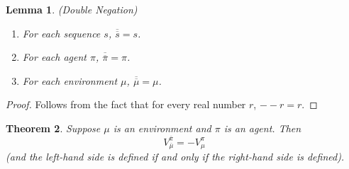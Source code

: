 \documentclass{article}
\newtheorem{theorem}{Theorem}
\newtheorem{lemma}[theorem]{Lemma}
\begin{document}
\begin{lemma}
\label{doublesubtractionlemma}
(Double Negation)
    \begin{enumerate}
        \item For each sequence $s$, $\overline{\overline s}=s$.
        \item For each agent $\pi$, $\overline{\overline \pi}=\pi$.
        \item For each environment $\mu$, $\overline{\overline \mu}=\mu$.
    \end{enumerate}
\end{lemma}

\begin{proof}
    Follows from the fact that for every real number $r$, $--r=r$.
\end{proof}

\begin{theorem}
\label{bigtheorem}
    Suppose $\mu$ is an environment and $\pi$ is an agent.
    Then
    \[
        V^{\overline \pi}_{\overline \mu}=-V^\pi_\mu
    \]
    (and the left-hand side is defined if and only if the right-hand side is defined).
\end{theorem}
\end{document}
